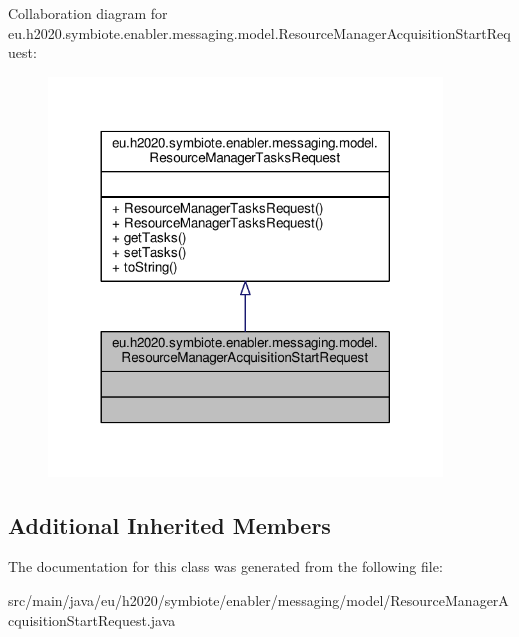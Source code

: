 Collaboration diagram for eu.\+h2020.\+symbiote.\+enabler.\+messaging.\+model.\+Resource\+Manager\+Acquisition\+Start\+Request\+:
\nopagebreak
\begin{figure}[H]
\begin{center}
\leavevmode
\includegraphics[width=296pt]{classeu_1_1h2020_1_1symbiote_1_1enabler_1_1messaging_1_1model_1_1ResourceManagerAcquisitionStartRequest__coll__graph}
\end{center}
\end{figure}
\subsection*{Additional Inherited Members}


The documentation for this class was generated from the following file\+:\begin{DoxyCompactItemize}
\item 
src/main/java/eu/h2020/symbiote/enabler/messaging/model/Resource\+Manager\+Acquisition\+Start\+Request.\+java\end{DoxyCompactItemize}
